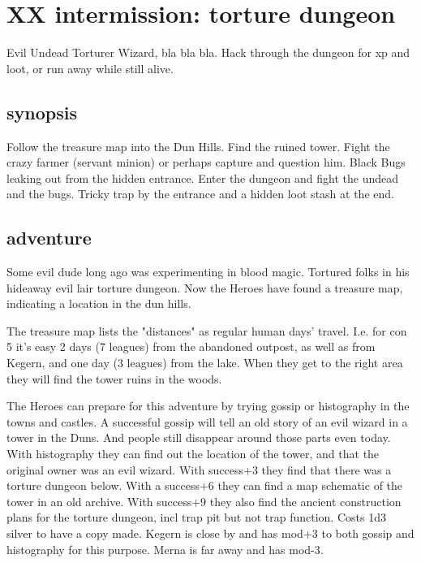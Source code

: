 \newpage
\section*{XX intermission: torture dungeon}

Evil Undead Torturer Wizard, bla bla bla. Hack through the dungeon for xp and loot, or run away while still alive.


\subsection*{synopsis}

Follow the treasure map into the Dun Hills. Find the ruined tower. Fight the crazy farmer (servant minion) or perhaps capture and question him. Black Bugs leaking out from the hidden entrance. Enter the dungeon and fight the undead and the bugs. Tricky trap by the entrance and a hidden loot stash at the end.


\subsection*{adventure}

Some evil dude long ago was experimenting in blood magic. Tortured folks in his hideaway evil lair torture dungeon. Now the Heroes have found a treasure map, indicating a location in the dun hills.

The treasure map lists the "distances" as regular human days' travel. I.e. for con 5 it's easy 2 days (7 leagues) from the abandoned outpost, as well as from Kegern, and one day (3 leagues) from the lake.
When they get to the right area they will find the tower ruins in the woods.

The Heroes can prepare for this adventure by trying gossip or histography in the towns and castles. A successful gossip will tell an old story of an evil wizard in a tower in the Duns. And people still disappear around those parts even today. With histography they can find out the location of the tower, and that the original owner was an evil wizard. With success+3 they find that there was a torture dungeon below. With a success+6 they can find a map schematic of the tower in an old archive. With success+9 they also find the ancient construction plans for the torture dungeon, incl trap pit but not trap function. Costs 1d3 silver to have a copy made. Kegern is close by and has mod+3 to both gossip and histography for this purpose. Merna is far away and has mod-3.


